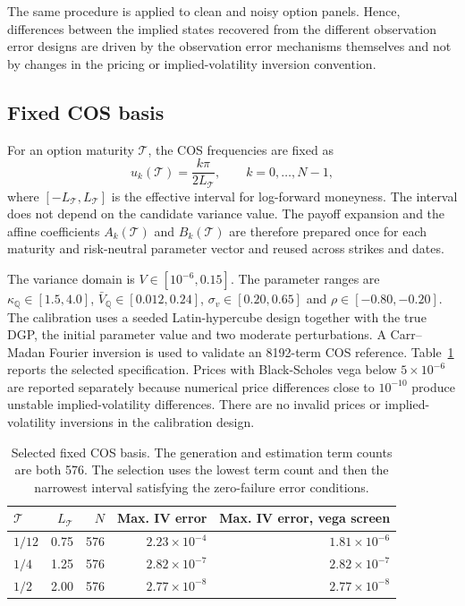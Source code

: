 \documentclass[11pt,a4paper,notitlepage]{article}
\numberwithin{equation}{section}
\begin{document}
The same procedure is applied to clean and noisy option panels. Hence, differences between the implied states recovered from the different observation error designs are driven by the observation error mechanisms themselves and not by changes in the pricing or implied-volatility inversion convention.

\subsection{Fixed COS basis}

For an option maturity \(\mathcal T\), the COS frequencies are fixed as
\begin{equation}
u_k(\mathcal T)
=
\frac{k\pi}{2L_{\mathcal T}},
\qquad k=0,\ldots,N-1,
\label{eq:app_fixed_cos_grid}
\end{equation}
where \([-L_{\mathcal T},L_{\mathcal T}]\) is the effective interval for log-forward moneyness. The interval does not depend on the candidate variance value. The payoff expansion and the affine coefficients \(A_k(\mathcal T)\) and \(B_k(\mathcal T)\) are therefore prepared once for each maturity and risk-neutral parameter vector and reused across strikes and dates.

The variance domain is \(V\in[10^{-6},0.15]\). The parameter ranges are \(\kappa_{\mathbb Q}\in[1.5,4.0]\), \(\bar V_{\mathbb Q}\in[0.012,0.24]\), \(\sigma_v\in[0.20,0.65]\) and \(\rho\in[-0.80,-0.20]\). The calibration uses a seeded Latin-hypercube design together with the true DGP, the initial parameter value and two moderate perturbations. A Carr--Madan Fourier inversion is used to validate an 8192-term COS reference. Table~\ref{tab:app_fixed_cos_calibration} reports the selected specification. Prices with Black-Scholes vega below \(5\times10^{-6}\) are reported separately because numerical price differences close to \(10^{-10}\) produce unstable implied-volatility differences. There are no invalid prices or implied-volatility inversions in the calibration design.

\begin{table}[H]
\centering
\begin{tabular}{lrrrr}
\toprule
\(\mathcal T\) & \(L_{\mathcal T}\) & \(N\) & Max. IV error & Max. IV error, vega screen \\
\midrule
\(1/12\) & 0.75 & 576 & \(2.23\times10^{-4}\) & \(1.81\times10^{-6}\) \\
\(1/4\)  & 1.25 & 576 & \(2.82\times10^{-7}\) & \(2.82\times10^{-7}\) \\
\(1/2\)  & 2.00 & 576 & \(2.77\times10^{-8}\) & \(2.77\times10^{-8}\) \\
\bottomrule
\end{tabular}
\caption{Selected fixed COS basis. The generation and estimation term counts are both 576. The selection uses the lowest term count and then the narrowest interval satisfying the zero-failure error conditions.}
\label{tab:app_fixed_cos_calibration}
\end{table}
\end{document}
